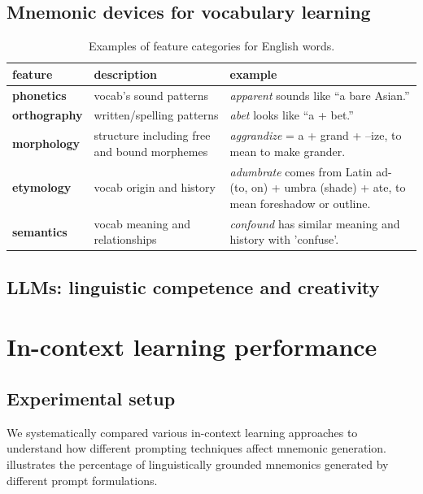 \documentclass[11pt]{article}
\begin{document}
\subsection{Mnemonic devices for vocabulary learning}

\begin{table}[htb]
\centering
\caption{Examples of feature categories for English words.}
\label{tab:linguistic-features}
\begin{tabularx}{\textwidth}{l >{\raggedright\arraybackslash}X >{\raggedright\arraybackslash}X}
\toprule
\textbf{feature} & \textbf{description} & \textbf{example} \\
\midrule
\textbf{phonetics} & vocab's sound patterns & \emph{apparent} sounds like “a bare Asian.” \\
\addlinespace
\textbf{orthography} & written/spelling patterns & \emph{abet} looks like “a + bet.” \\
\addlinespace
\textbf{morphology} & structure including free and bound morphemes & \emph{aggrandize} = a + grand + –ize, to mean to make grander. \\
\addlinespace
\textbf{etymology} & vocab origin and history & \emph{adumbrate} comes from Latin ad- (to, on) + umbra (shade) + ate, to mean foreshadow or outline. \\
\addlinespace
\textbf{semantics} & vocab meaning and relationships & \emph{confound} has similar meaning and history with 'confuse'. \\
\bottomrule
\end{tabularx}
\end{table}

\subsection{LLMs: linguistic competence and creativity}

\section{In-context learning performance} \label{sec:icl-performance}

\subsection{Experimental setup}
We systematically compared various in-context learning approaches to understand how different prompting techniques affect mnemonic generation.  illustrates the percentage of linguistically grounded mnemonics generated by different prompt formulations.
\end{document}
